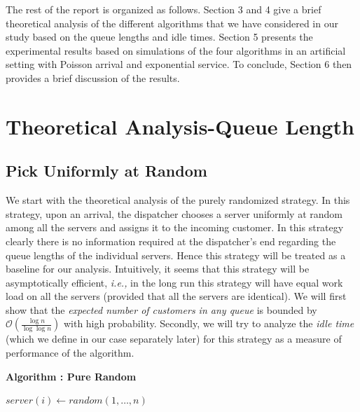 \documentclass[a4paper,english,11pt]{article}
\begin{document}
\par The rest of the report is organized as follows. Section 3 and 4 give a brief theoretical analysis of the different algorithms that we have considered in our study based on the queue lengths and idle times. Section 5 presents the experimental results based on simulations of the four algorithms in an artificial setting with Poisson arrival and exponential service. To conclude, Section 6 then provides a brief discussion of the results.
\section{Theoretical Analysis-Queue Length}
\subsection{Pick Uniformly at Random}
We start with the theoretical analysis of the purely randomized strategy. In this strategy, upon an arrival, the dispatcher chooses a server uniformly at random among all the servers and assigns it to the incoming customer. In this strategy clearly there is no information required at the dispatcher's end regarding the queue lengths of the individual servers. Hence this strategy will be treated as a baseline for our analysis. Intuitively, it seems that this strategy will be asymptotically efficient, \textit{i.e.,} in the long run this strategy will have equal work load on all the servers (provided that all the servers are identical). We will first show that the \textit{expected number of customers in any queue} is bounded by $\mathcal{O}(\frac{\log n}{\log \log n})$ with high probability. Secondly, we will try to analyze the \textit{idle time} (which we define in our case separately later) for this strategy as a measure of performance of the algorithm.


\begin{algorithm}
\textbf{{Algorithm : Pure Random}}\label{euclid1}
\begin{algorithmic}[1]
\State ${server(i) \gets random(1,\ldots,n)}$
\EndFor
\State \Return 
\end{algorithmic}
\end{algorithm}
 
\end{document}
